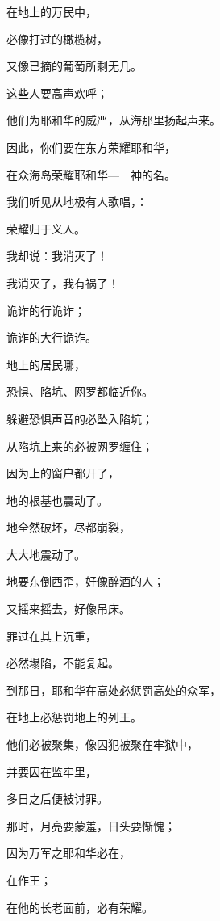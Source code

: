 {\par }{\Q {}在地上的万民中，
\par }{\Q 必像打过的橄榄树，
\par }{\Q 又像已摘的葡萄所剩无几。
\par }{\BB \par }{\Q {}这些人要高声欢呼；
\par }{\Q 他们为耶和华的威严，从海那里扬起声来。
\par }{\Q {}因此，你们要在东方荣耀耶和华，
\par }{\Q 在众海岛荣耀耶和华—{}　神的名。
\par }{\Q {}我们听见从地极有人歌唱，{}：
\par }{\Q 荣耀归于义人。
\par }{\Q 我却说：我消灭了！
\par }{\Q 我消灭了，我有祸了！
\par }{\Q 诡诈的行诡诈；
\par }{\Q 诡诈的大行诡诈。
\par }{\BB \par }{\Q {}地上的居民哪，
\par }{\Q 恐惧、陷坑、网罗都临近你。
\par }{\Q {}躲避恐惧声音的必坠入陷坑；
\par }{\Q 从陷坑上来的必被网罗缠住；
\par }{\Q 因为{}上的窗户都开了，
\par }{\Q 地的根基也震动了。
\par }{\Q {}地全然破坏，尽都崩裂，
\par }{\Q 大大地震动了。
\par }{\Q {}地要东倒西歪，好像醉酒的人；
\par }{\Q 又摇来摇去，好像吊床。
\par }{\Q 罪过在其上沉重，
\par }{\Q 必然塌陷，不能复起。
\par }{\BB \par }{\Q {}到那日，耶和华在高处必惩罚高处的众军，
\par }{\Q 在地上必惩罚地上的列王。
\par }{\Q {}他们必被聚集，像囚犯被聚在牢狱中，
\par }{\Q 并要囚在监牢里，
\par }{\Q 多日之后便被讨罪。
\par }{\Q {}那时，月亮要蒙羞，日头要惭愧；
\par }{\Q 因为万军之耶和华必在{}，
\par }{\Q 在{}作王；
\par }{\Q 在{}他的长老面前，必有荣耀。

}
